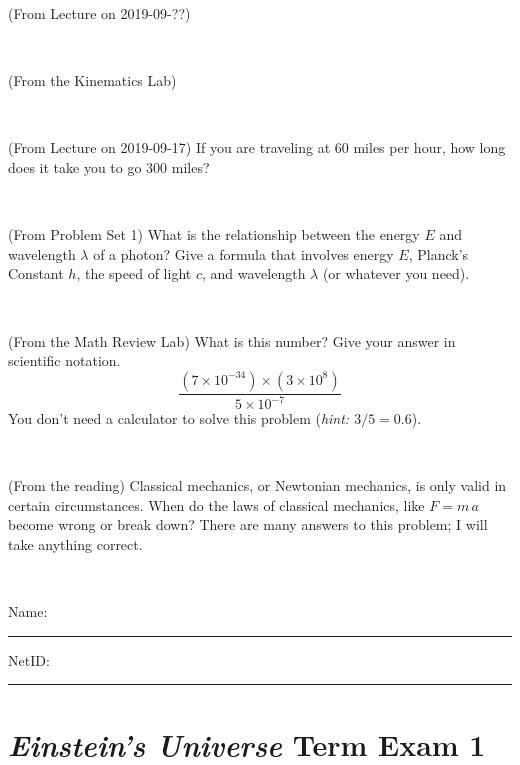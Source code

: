 \documentclass[12pt, letterpaper]{article}
\begin{document}
\begin{problem} (From Lecture on 2019-09-??)
\end{problem}


\vfill ~

\begin{problem} (From the Kinematics Lab)

\end{problem}


\vfill ~


\clearpage


\begin{problem} (From Lecture on 2019-09-17)
If you are traveling at 60 miles per hour, how long does
it take you to go 300 miles?
\end{problem}


\vfill ~

\begin{problem} (From Problem Set 1)
What is the relationship between the energy $E$ and wavelength
$\lambda$ of a photon? Give a formula that involves energy $E$,
Planck's Constant $h$, the speed of light $c$, and wavelength
$\lambda$ (or whatever you need).
\end{problem}

\vfill ~

\begin{problem} (From the Math Review Lab)
What is this number? Give your answer in scientific notation.
$$
\frac{(7\times10^{-34})\times(3\times10^8)}{5\times10^{-7}}
$$
You don't need a calculator to solve this problem (\textit{hint: $3/5=0.6$}).
\end{problem}


\vfill ~

\begin{problem} (From the reading)
Classical mechanics, or Newtonian mechanics, is only valid in certain
circumstances. When do the laws of classical mechanics, like $F =
m\,a$ become wrong or break down? There are many answers to this
problem; I will take anything correct.
\end{problem}


\vfill ~


\cleardoublepage



\noindent
Name: \rule[-1ex]{0.60\textwidth}{0.1pt}
NetID: \rule[-1ex]{0.20\textwidth}{0.1pt}

\section*{\textsl{Einstein's Universe} Term Exam 1}
\setcounter{problem}{1}
\end{document}
